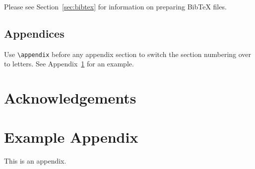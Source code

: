 \documentclass[11pt]{article}
\begin{document}
Please see Section~\ref{sec:bibtex} for information on preparing Bib\TeX{} files.

\subsection{Appendices}

Use \verb|\appendix| before any appendix section to switch the section numbering over to letters. See Appendix~\ref{sec:appendix} for an example.

\section*{Acknowledgements}



\appendix

\section{Example Appendix}
\label{sec:appendix}

This is an appendix.
\end{document}
